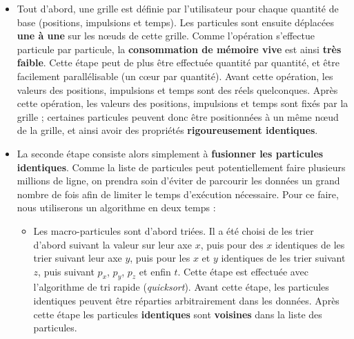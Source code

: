 \begin{refsection}
\begin{itemize}
    \item Tout d'abord, une grille est définie par l'utilisateur pour chaque quantité de base (positions, impulsions et temps). Les particules sont ensuite déplacées \textbf{une à une} sur les nœuds de cette grille. Comme l'opération s'effectue particule par particule, la \textbf{consommation de mémoire vive} est ainsi \textbf{très faible}. Cette étape peut de plus être effectuée quantité par quantité, et être facilement parallélisable (un cœur par quantité). Avant cette opération, les valeurs des positions, impulsions et temps sont des réels quelconques. Après cette opération, les valeurs des positions, impulsions et temps sont fixés par la grille ; certaines particules peuvent donc être positionnées à un même nœud de la grille, et ainsi avoir des propriétés \textbf{rigoureusement identiques}.
    
    \item La seconde étape consiste alors simplement à \textbf{fusionner les particules identiques}. Comme la liste de particules peut potentiellement faire plusieurs millions de ligne, on prendra soin d'éviter de parcourir les données un grand nombre de fois afin de limiter le temps d’exécution nécessaire. Pour ce faire, nous utiliserons un algorithme en deux temps :
    \begin{itemize}
        \item Les macro-particules sont d'abord triées. Il a été choisi de les trier d'abord suivant la valeur sur leur axe $x$, puis pour des $x$ identiques de les trier suivant leur axe $y$, puis pour les $x$ et $y$ identiques de les trier suivant $z$, puis suivant $p_x$, $p_y$, $p_z$ et enfin $t$. Cette étape est effectuée avec l'algorithme de tri rapide (\textit{quicksort}). Avant cette étape, les particules identiques peuvent être réparties arbitrairement dans les données. Après cette étape les particules \textbf{identiques} sont \textbf{voisines} dans la liste des particules.
        

\end{itemize}
\end{itemize}
\end{refsection}
